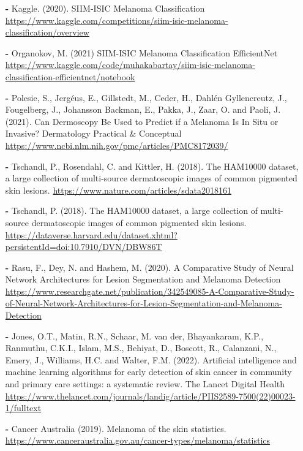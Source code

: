 \documentclass{article}
\begin{document}
\raggedright
\begin{itemize}
    \item[\textbf{-}] Kaggle. (2020). SIIM-ISIC Melanoma Classification \href{https://www.kaggle.com/competitions/siim-isic-melanoma-classification/overview}{https://www.kaggle.com/competitions/siim-isic-melanoma-classification/overview}
    \item[\textbf{-}]Organokov, M. (2021) SIIM-ISIC Melanoma Classification EfficientNet
    \href{https://www.kaggle.com/code/muhakabartay/siim-isic-melanoma-classification-efficientnet/notebook}{https://www.kaggle.com/code/muhakabartay/siim-isic-melanoma-classification-efficientnet/notebook}
    \item[\textbf{-}]Polesie, S., Jergéus, E., Gillstedt, M., Ceder, H., Dahlén Gyllencreutz, J., Fougelberg, J., Johansson Backman, E., Pakka, J., Zaar, O. and Paoli, J. (2021). Can Dermoscopy Be Used to Predict if a Melanoma Is In Situ or Invasive? Dermatology Practical & Conceptual
    \href{https://www.ncbi.nlm.nih.gov/pmc/articles/PMC8172039/}{https://www.ncbi.nlm.nih.gov/pmc/articles/PMC8172039/}
    \item[\textbf{-}]Tschandl, P., Rosendahl, C. and Kittler, H. (2018). The HAM10000 dataset, a large collection of multi-source dermatoscopic images of common pigmented skin lesions.
    \href{https://www.nature.com/articles/sdata2018161}{https://www.nature.com/articles/sdata2018161}
    \item[\textbf{-}]Tschandl, P. (2018). The HAM10000 dataset, a large collection of multi-source dermatoscopic images of common pigmented skin lesions.
    \href{https://dataverse.harvard.edu/dataset.xhtml?persistentId=doi:10.7910/DVN/DBW86T}{https://dataverse.harvard.edu/dataset.xhtml?persistentId=doi:10.7910/DVN/DBW86T}
    \item[\textbf{-}]Rasu, F., Dey, N. and Hashem, M. (2020). A Comparative Study of Neural Network Architectures for Lesion Segmentation and Melanoma Detection
    \href{https://www.researchgate.net/publication/342549085_A_Comparative_Study_of_Neural_Network_Architectures_for_Lesion_Segmentation_and_Melanoma_Detection}{https://www.researchgate.net/publication/342549085-A-Comparative-Study-of-Neural-Network-Architectures-for-Lesion-Segmentation-and-Melanoma-Detection}
    \item[\textbf{-}]Jones, O.T., Matin, R.N., Schaar, M. van der, Bhayankaram, K.P., Ranmuthu, C.K.I., Islam, M.S., Behiyat, D., Boscott, R., Calanzani, N., Emery, J., Williams, H.C. and Walter, F.M. (2022). Artificial intelligence and machine learning algorithms for early detection of skin cancer in community and primary care settings: a systematic review. The Lancet Digital Health
    \href{https://www.thelancet.com/journals/landig/article/PIIS2589-7500(22)00023-1/fulltext}{https://www.thelancet.com/journals/landig/article/PIIS2589-7500(22)00023-1/fulltext}
    \item[\textbf{-}]Cancer Australia (2019). Melanoma of the skin statistics. 
    \href{https://www.canceraustralia.gov.au/cancer-types/melanoma/statistics}{https://www.canceraustralia.gov.au/cancer-types/melanoma/statistics}
\end{itemize}
\end{document}
